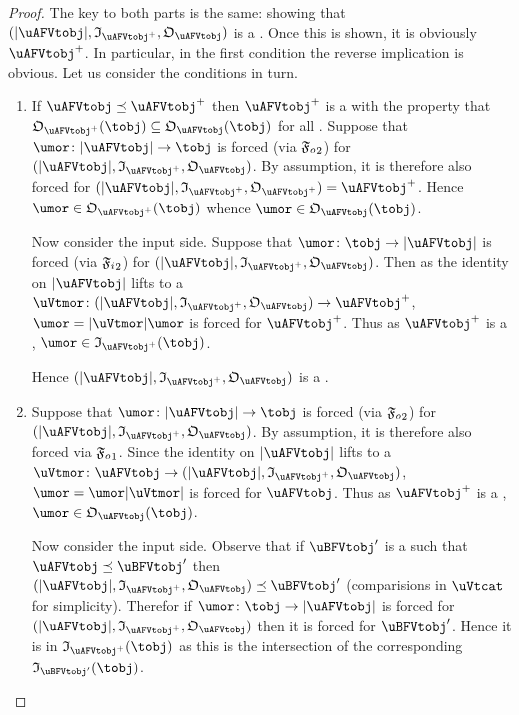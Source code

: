 \documentclass[%
a4paper,%
arxiv,%
defaults
]{myclass}
\begin{document}
\begin{proof}
The key to both parts is the same: showing that \((\forfunc[\uAFVtobj], \itest_{\mMo{\uAFVtobj}}, \otest_{\uAFVtobj})\) is a \uBFVtobjalt.
Once this is shown, it is obviously \(\mMo{\uAFVtobj}\).
In particular, in the first condition the reverse implication is obvious.
Let us consider the conditions in turn.

\begin{enumerate}
\item If \(\uAFVtobj \preceq \mMo{\uAFVtobj}\) then \(\mMo{\uAFVtobj}\) is a \uBFVtobjalt with the property that \(\otest_{\mMo{\uAFVtobj}}(\tobj) \subseteq \otest_{\uAFVtobj}(\tobj)\) for all \tobjs[\tobj].
Suppose that \(\umor \colon \forfunc[\uAFVtobj] \to \tobj\) is forced (via \(\mBo{\oforce}\)) for \((\forfunc[\uAFVtobj], \itest_{\mMo{\uAFVtobj}}, \otest_{\uAFVtobj})\).
By assumption, it is therefore also forced for \((\forfunc[\uAFVtobj], \itest_{\mMo{\uAFVtobj}}, \otest_{\mMo{\uAFVtobj}}) = \mMo{\uAFVtobj}\).
Hence \(\umor \in \otest_{\mMo{\uAFVtobj}}(\tobj)\) whence \(\umor \in \otest_{\uAFVtobj}(\tobj)\).

Now consider the input side.
Suppose that \(\umor \colon \tobj \to \forfunc[\uAFVtobj]\) is forced (via \(\mBo{\iforce}\)) for \((\forfunc[\uAFVtobj], \itest_{\mMo{\uAFVtobj}}, \otest_{\uAFVtobj})\).
Then as the identity on \(\forfunc[\uAFVtobj]\) lifts to a \uVtmor \(\uVtmor \colon (\forfunc[\uAFVtobj], \itest_{\mMo{\uAFVtobj}}, \otest_{\uAFVtobj}) \to \mMo{\uAFVtobj}\), \(\umor = \forfunc[\uVtmor]\umor\) is forced for \(\mMo{\uAFVtobj}\).
Thus as \(\mMo{\uAFVtobj}\) is a \uBFVtobjalt, \(\umor \in \itest_{\mMo{\uAFVtobj}}(\tobj)\).

Hence \((\forfunc[\uAFVtobj], \itest_{\mMo{\uAFVtobj}}, \otest_{\uAFVtobj})\) is a \uBFVtobjalt.

\item Suppose that  \(\umor \colon \forfunc[\uAFVtobj] \to \tobj\) is forced (via \(\mBo{\oforce}\)) for \((\forfunc[\uAFVtobj], \itest_{\mMo{\uAFVtobj}}, \otest_{\uAFVtobj})\).
By assumption, it is therefore also forced via \(\mAo{\oforce}\).
Since the identity on \(\forfunc[\uAFVtobj]\) lifts to a \uVtmor \(\uVtmor \colon \uAFVtobj \to (\forfunc[\uAFVtobj], \itest_{\mMo{\uAFVtobj}}, \otest_{\uAFVtobj})\), \(\umor = \umor \forfunc[\uVtmor]\) is forced for \(\uAFVtobj\).
Thus as \(\mMo{\uAFVtobj}\) is a \uAFVtobjalt, \(\umor \in \otest_{\uAFVtobj}(\tobj)\).

Now consider the input side.
Observe that if \(\uBFVtobj'\) is a \uBFVtobjalt such that \(\uAFVtobj \preceq \uBFVtobj'\) then \((\forfunc[\uAFVtobj], \itest_{\mMo{\uAFVtobj}}, \otest_{\uAFVtobj}) \preceq \uBFVtobj'\) (comparisions in \(\uVtcat\) for simplicity).
Therefor if \(\umor \colon \tobj \to \forfunc[\uAFVtobj]\) is forced for \((\forfunc[\uAFVtobj], \itest_{\mMo{\uAFVtobj}}, \otest_{\uAFVtobj})\) then it is forced for \(\uBFVtobj'\).
Hence it is in \(\itest_{\mMo{\uAFVtobj}}(\tobj)\) as this is the intersection of the corresponding \(\itest_{\uBFVtobj'}(\tobj)\).


\end{enumerate}
\end{proof}
\end{document}
